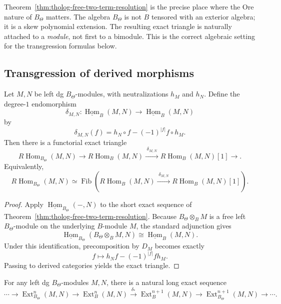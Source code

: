 \begin{remark}
\label{rem:tholog-why-one-sided}
Theorem~\ref{thm:tholog-free-two-term-resolution} is the precise place where the Ore nature of \(B_{\Theta}\) matters.
The algebra \(B_{\Theta}\) is not \(B\) tensored with an exterior algebra; it is a skew polynomial extension.
The resulting exact triangle is naturally attached to a \emph{module}, not first to a bimodule.
This is the correct algebraic setting for the transgression formulas below.
\end{remark}

\subsection{Transgression of derived morphisms}
\label{subsec:tholog-derived-morphisms}

\begin{theorem}
\label{thm:tholog-derived-hom}
Let \(M,N\) be left dg \(B_{\Theta}\)-modules, with neutralizations \(h_{M}\) and \(h_{N}\).
Define the degree-\(1\) endomorphism
\[
\delta_{M,N}:\underline{\operatorname{Hom}}_{B}(M,N)\longrightarrow
\underline{\operatorname{Hom}}_{B}(M,N)
\]
by
\[
\delta_{M,N}(f)=h_{N}\circ f-(-1)^{|f|}f\circ h_{M}.
\]
Then there is a functorial exact triangle
\[
R\!\operatorname{Hom}_{B_{\Theta}}(M,N)
\longrightarrow
R\!\operatorname{Hom}_{B}(M,N)
\xrightarrow{\;\delta_{M,N}\;}
R\!\operatorname{Hom}_{B}(M,N)[1]
\longrightarrow .
\]
Equivalently,
\[
R\!\operatorname{Hom}_{B_{\Theta}}(M,N)
\simeq
\operatorname{Fib}\!\left(
R\!\operatorname{Hom}_{B}(M,N)
\xrightarrow{\;\delta_{M,N}\;}
R\!\operatorname{Hom}_{B}(M,N)[1]
\right).
\]
\end{theorem}

\begin{proof}
Apply \(\underline{\operatorname{Hom}}_{B_{\Theta}}(-,N)\) to the short exact sequence of Theorem~\ref{thm:tholog-free-two-term-resolution}.
Because \(B_{\Theta}\otimes_{B}M\) is a free left \(B_{\Theta}\)-module on the underlying \(B\)-module \(M\), the standard adjunction gives
\[
\underline{\operatorname{Hom}}_{B_{\Theta}}(B_{\Theta}\otimes_{B}M,N)
\cong
\underline{\operatorname{Hom}}_{B}(M,N).
\]
Under this identification, precomposition by \(D_{M}\) becomes exactly
\[
f\longmapsto h_{N}f-(-1)^{|f|}fh_{M}.
\]
Passing to derived categories yields the exact triangle.
\end{proof}

\begin{corollary}
\label{cor:tholog-long-exact-ext}
For any left dg \(B_{\Theta}\)-modules \(M,N\), there is a natural long exact sequence
\[
\cdots\to
\operatorname{Ext}^{n}_{B_{\Theta}}(M,N)
\to
\operatorname{Ext}^{n}_{B}(M,N)
\xrightarrow{\;\delta_{*}\;}
\operatorname{Ext}^{n+1}_{B}(M,N)
\to
\operatorname{Ext}^{n+1}_{B_{\Theta}}(M,N)
\to\cdots.
\]
\end{corollary}

